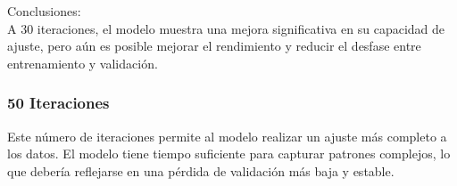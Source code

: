 \documentclass{article}
\begin{document}
{\large{Conclusiones}}: \\

A 30 iteraciones, el modelo muestra una mejora significativa en su capacidad de ajuste, pero aún es posible mejorar el rendimiento y reducir el desfase entre entrenamiento y validación.

\newpage

\subsubsection{50 Iteraciones}
Este número de iteraciones permite al modelo realizar un ajuste más completo a los datos. El modelo tiene tiempo suficiente para capturar patrones complejos, lo que debería reflejarse en una pérdida de validación más baja y estable. \\
\end{document}
